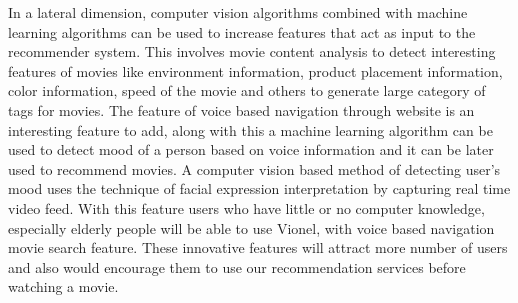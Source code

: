     In a lateral dimension, computer vision algorithms combined with machine learning algorithms can be used to increase features that act as input to the recommender system. This involves movie content analysis to detect interesting features of movies like environment information, product placement information, color information, speed of the movie and others to generate large category of tags for movies. The feature of voice based navigation through website is an interesting feature to add, along with this a machine learning algorithm can be used to detect mood of a person based on voice information and it can be later used to recommend movies. A computer vision based method of detecting user's mood uses the technique of facial expression interpretation by capturing real time video feed. With this feature users who have little or no computer knowledge, especially elderly people will be able to use Vionel, with voice based navigation movie search feature. These innovative features will attract more number of users and also would encourage them to use our recommendation services before watching a movie.     

